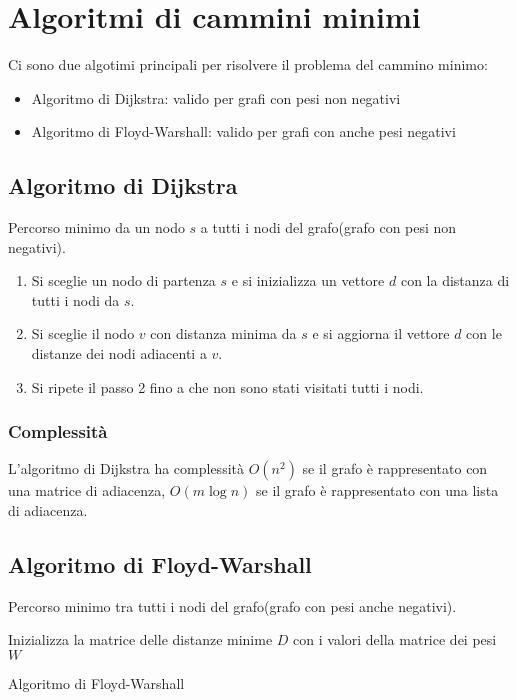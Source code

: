   \chapter{Algoritmi di cammini minimi}


  Ci sono due algotimi principali per risolvere il problema del cammino minimo:
  \begin{itemize}
    \item Algoritmo di Dijkstra: valido per grafi con pesi non negativi
    \item Algoritmo di Floyd-Warshall: valido per grafi con anche pesi negativi
  \end{itemize}


  \section{Algoritmo di Dijkstra}
  Percorso minimo da un nodo $s$ a tutti i nodi del grafo(grafo con pesi non negativi).

  \begin{enumerate}
    \item Si sceglie un nodo di partenza $s$ e si inizializza un vettore $d$ con la distanza di tutti i nodi da $s$.
    \item Si sceglie il nodo $v$ con distanza minima da $s$ e si aggiorna il vettore $d$ con le distanze dei nodi adiacenti a $v$.
    \item Si ripete il passo 2 fino a che non sono stati visitati tutti i nodi.
  \end{enumerate}


  \subsection{Complessit\`a}
  L'algoritmo di Dijkstra ha complessit\`a $O(n^2)$ se il grafo \`e rappresentato con una matrice di adiacenza, $O(m \log n)$ se il grafo \`e rappresentato con una lista di adiacenza.



  \section{Algoritmo di Floyd-Warshall}
  Percorso minimo tra tutti i nodi del grafo(grafo con pesi anche negativi).



\begin{algorithm}[H]
\SetAlgoLined
{}

Inizializza la matrice delle distanze minime $D$ con i valori della matrice dei pesi $W$\;


\;
\caption{Algoritmo di Floyd-Warshall}
\end{algorithm}

